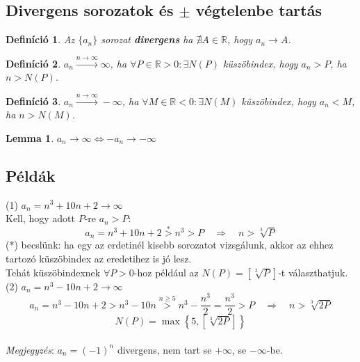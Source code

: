 \documentclass[a4paper,12pt,twoside]{book}
\newtheorem{defi}{Definíció}[chapter]
\newtheorem{lemma}{Lemma}[chapter]
\theoremstyle{break}
\theoremstyle{plain}
\begin{document}
\subsection{Divergens sorozatok és $\pm$ végtelenbe tartás}

\begin{defi}Az $\{a_n\}$ sorozat \textbf{divergens} ha $\nexists A\in\mathbb{R}$, hogy $a_n\to A$.\end{defi}

\begin{defi}$a_n \xrightarrow{n\to\infty} \infty$, ha $\forall P\in\mathbb{R}>0:\exists N(P)$ küszöbindex, hogy $a_n>P$, ha $n>N(P)$.\end{defi}

\begin{defi}$a_n \xrightarrow{n\to\infty} -\infty$, ha $\forall M\in\mathbb{R}<0:\exists N(M)$ küszöbindex, hogy $a_n<M$, ha $n>N(M)$.\end{defi}

\begin{lemma}$\boxed{a_n \to \infty \Longleftrightarrow -a_n \to -\infty}$\end{lemma}

\subsection{Példák}

(1) $a_n=n^3+10n+2 \to \infty$\\
Kell, hogy adott $P$-re $a_n>P$:
\[a_n=n^3+10n+2\overset{*}{>}n^3>P \quad \Longrightarrow \quad n>\sqrt[3]{P}\]
(*) becslünk: ha egy az erdetinél kisebb sorozatot vizsgálunk, akkor az ehhez tartozó küszöbindex az eredetihez is jó lesz.\\
Tehát küszöbindexnek $\forall P>0$-hoz például az $N(P)=\left[\sqrt[3]{P}\right]$-t választhatjuk.\\

(2) $a_n=n^3-10n+2 \to \infty$
\[a_n = n^3-10n+2 > n^3-10n \overset{n\geqslant 5}{>} n^3-\frac{n^3}{2}=\frac{n^3}{2} > P \quad \Longrightarrow \quad n>\sqrt[3]{2P}\]
\[N(P)=\max\left\{5, \left[\sqrt[3]{2P}\right]\right\}\]
\\
\textit{Megjegyzés}: $a_n = (-1)^n$ divergens, nem tart se $+\infty$, se $-\infty$-be.
\end{document}
